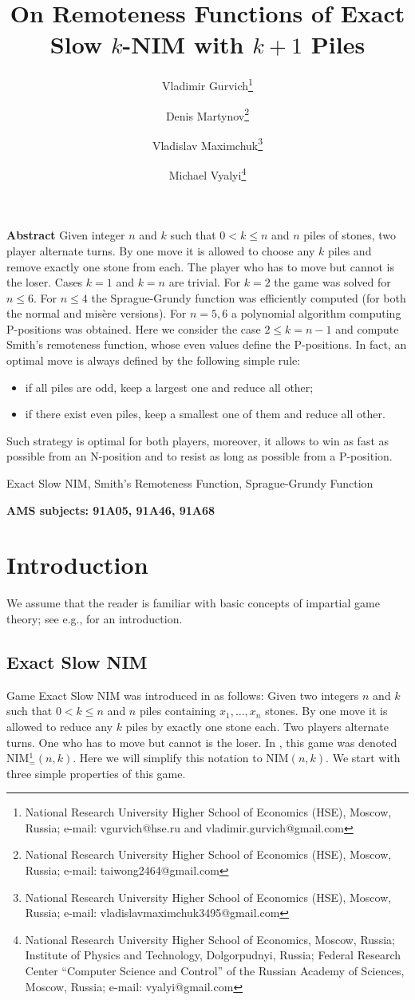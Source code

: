 \documentclass{article}
\title{On Remoteness Functions 
of Exact Slow $k$-NIM with $k+1$ Piles}
\author{
Vladimir Gurvich\thanks{
National Research University Higher School of Economics (HSE), Moscow, Russia; e-mail:
vgurvich@hse.ru and vladimir.gurvich@gmail.com}
\and
Denis Martynov\thanks{
National Research University Higher School of Economics (HSE), Moscow, Russia; e-mail:
taiwong2464@gmail.com}
\and
Vladislav Maximchuk\thanks{
National Research University Higher School of Economics (HSE), Moscow, Russia; e-mail:
vladislavmaximchuk3495@gmail.com}
\and
Michael Vyalyi\thanks
{National Research University Higher School of Economics, Moscow, Russia;
  Institute of Physics and Technology, Dolgorpudnyi, Russia; Federal Research Center ``Computer Science and Control'' of the Russian Academy of Sciences, Moscow, Russia;
 e-mail:
vyalyi@gmail.com}
}
\theoremstyle{definition}
\begin{document}
\maketitle 

{\bf Abstract}
Given integer $n$ and $k$ such that $0 < k \leq n$ 
and  $n$ piles of stones, 
two player alternate turns. 
By one move it is allowed 
to choose any  $k$  piles and remove  
exactly one stone from each.
The player who has to move but cannot is the loser. 
Cases  $k=1$  and $k = n$  are  trivial. 
For $k=2$  the game was solved for  $n \leq 6$. 
For $n \leq 4$  the Sprague-Grundy function was 
efficiently computed 
(for both the normal and mis\`ere versions). 
For $n = 5,6$  a polynomial algorithm 
computing P-positions was obtained. 
Here we consider the case $2 \leq k = n-1$ 
and compute Smith's remoteness function,  
whose even values define the P-positions. 
In fact, an optimal move 
is always defined by the following simple rule:
\begin{itemize}
\item{}
if all piles are odd, 
keep a largest one and reduce all other;
\item{} if there exist even piles, 
keep a smallest one of them 
and reduce all other. 
\end{itemize}

Such strategy is optimal for both players, moreover,  
it allows  to win as fast as possible 
from an N-position and 
to resist as long as possible from a P-position. 

\medskip 

Exact Slow NIM, Smith's Remoteness Function, 
Sprague-Grundy Function

\medskip 

{\bf AMS subjects:  91A05, 91A46, 91A68} 

\section{Introduction} 
\label{s0}
We assume that the reader is familiar 
with basic concepts of impartial game theory; 
see e.g., \cite{ANW07,BCG01-04} for an introduction. 

\subsection{Exact Slow NIM} 
\label{ss00}
Game Exact Slow NIM  
was introduced in \cite{GH15} as follows: 
Given two integers  $n$ and $k$  
such that  $0 < k \leq n$  and  
$n$  piles containing  $x_1, \dots, x_n$  stones.  
By one move it is allowed to reduce any  $k$  piles 
by exactly one stone each. 
Two players alternate turns. 
One who has to move but cannot is the loser.  
In \cite{GH15}, this game was denoted  NIM$^1_=(n,k)$.
Here we will simplify this notation to  NIM$(n,k)$.
We start with three simple properties of this game. 
\end{document}
